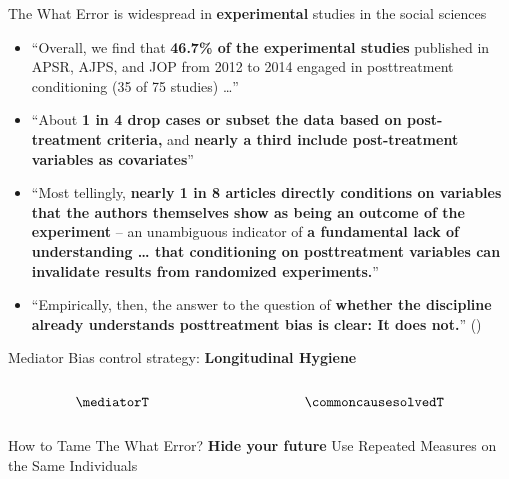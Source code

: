 \documentclass[
  ignorenonframetext,
  aspectratio=169,
  xcolor=\{dvipsnames\}]{beamer}
\begin{document}
\begin{frame}{The What Error is widespread in \textbf{experimental}
studies in the social sciences}
\label{the-what-error-is-widespread-in-experimental-studies-in-the-social-sciences}
\begin{itemize}
\item
  ``Overall, we find that \textbf{46.7\% of the experimental studies}
  published in APSR, AJPS, and JOP from 2012 to 2014 engaged in
  posttreatment conditioning (35 of 75 studies) \ldots{}''
\item
  ``About \textbf{1 in 4 drop cases or subset the data based on
  post-treatment criteria,} and \textbf{nearly a third include
  post-treatment variables as covariates}''
\item
  ``Most tellingly, \textbf{nearly 1 in 8 articles directly conditions
  on variables that the authors themselves show as being an outcome of
  the experiment} -- an unambiguous indicator of \textbf{a fundamental
  lack of understanding \ldots{} that conditioning on posttreatment
  variables can invalidate results from randomized experiments.}''
\item
  ``Empirically, then, the answer to the question of \textbf{whether the
  discipline already understands posttreatment bias is clear: It does
  not.}'' ()
\end{itemize}
\end{frame}

\begin{frame}{Mediator Bias control strategy: \textbf{Longitudinal
Hygiene}}
\label{mediator-bias-control-strategy-longitudinal-hygiene}
\begin{columns}[T]
\begin{column}{0.5\linewidth}
\[
\mediatorT
\]
\end{column}

\begin{column}{0.5\linewidth}
\[
\commoncausesolvedT
\]
\end{column}
\end{columns}
\end{frame}

\begin{frame}{How to Tame The What Error? \textbf{Hide your future}}
\label{how-to-tame-the-what-error-hide-your-future}
Use Repeated Measures on the Same Individuals
\end{frame}
\end{document}
